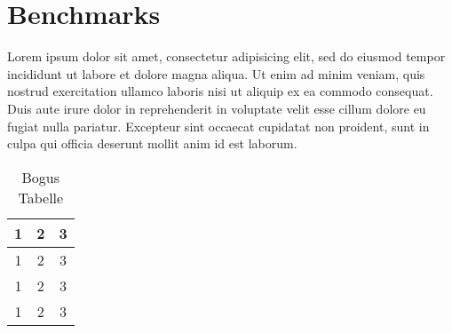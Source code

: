 \chapter{Benchmarks} %
\label{cha:benchmarks}

Lorem ipsum dolor sit amet, consectetur adipisicing elit, sed do eiusmod tempor incididunt ut labore et dolore magna aliqua. Ut enim ad minim veniam, quis nostrud exercitation ullamco laboris nisi ut aliquip ex ea commodo consequat. Duis aute irure dolor in reprehenderit in voluptate velit esse cillum dolore eu fugiat nulla pariatur. Excepteur sint occaecat cupidatat non proident, sunt in culpa qui officia deserunt mollit anim id est laborum.

\begin{table}
  \centering
  \begin{tabular}{|ccc|}
    \hline
    1 & 2 & 3 \\ \hline
    1 & 2 & 3 \\
    1 & 2 & 3 \\
    1 & 2 & 3 \\
    \hline
  \end{tabular}
  \caption{Bogus Tabelle}
\end{table}

